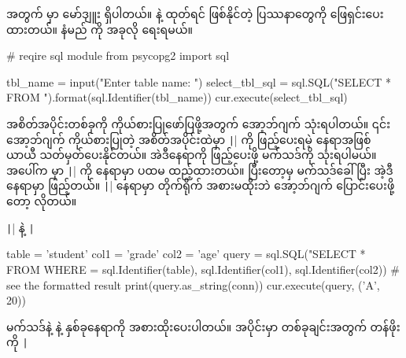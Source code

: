  အတွက်  မှာ  မော်ဒျူး ရှိပါတယ်။  နဲ့  ထုတ်ရင် ဖြစ်နိုင်တဲ့ ပြဿနာတွေကို ဖြေရှင်းပေးထားတယ်။  နံမည်  ကို အခုလို ရေးရမယ်။
%
\begin{py}
# reqire sql module
from psycopg2 import sql

tbl_name = input("Enter table name: ")
select_tbl_sql = sql.SQL("SELECT * FROM {}").format(sql.Identifier(tbl_name))
cur.execute(select_tbl_sql)
\end{py}
%
 အစိတ်အပိုင်းတစ်ခုကို ကိုယ်စားပြုဖော်ပြဖို့အတွက်  အော့ဘ်ဂျက် သုံးရပါတယ်။ ၎င်းအော့ဘ်ဂျက် ကိုယ်စားပြုတဲ့  အစိတ်အပိုင်းထဲမှာ \texttt|{}| ကို ဖြည့်ပေးရမဲ့ နေရာအဖြစ် ယာယီ သတ်မှတ်ပေးနိုင်တယ်။ အဲဒီနေရာကို ဖြည့်ပေးဖို့  မက်သဒ်ကို သုံးရပါမယ်။ အပေါ်က   မှာ \texttt|{}| ကို  နေရာမှာ ပထမ ထည့်ထားတယ်။ ပြီးတော့မှ  မက်သဒ်ခေါ်ပြီး အဲ့ဒီနေရာမှာ  ဖြည့်တယ်။ \texttt|{}| နေရာမှာ  တိုက်ရိုက် အစားမထိုးဘဲ  အော့ဘ်ဂျက် ပြောင်းပေးဖို့တော့ လိုတယ်။



\texttt|{}| နဲ့ \texttt|%
%
\begin{py}
table = 'student'
col1 = 'grade'
col2 = 'age'
query = sql.SQL("SELECT * FROM {} WHERE {} = %
    sql.Identifier(table), sql.Identifier(col1), sql.Identifier(col2))
# see the formatted result
print(query.as_string(conn))
cur.execute(query, ('A', 20))
\end{py}
%
 မက်သဒ်နဲ့  နဲ့  နှစ်ခုနေရာကို \fEn{,} \fEn{,}  အစားထိုးပေးပါတယ်။  အပိုင်းမှာ  တစ်ခုချင်းအတွက် တန်ဖိုးကို \texttt|%

